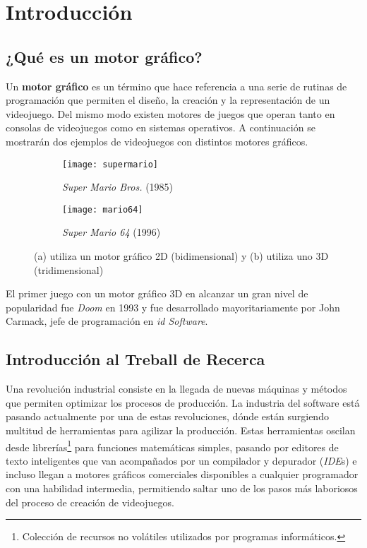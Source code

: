 \chapter{Introducción}
\graphicspath{ {img/chapter1/} {img/chapter4/} {img/chapter6/}}
\section{¿Qué es un motor gráfico?}
Un \textbf{motor gráfico} es un término que hace referencia a una serie de rutinas de programación que permiten el diseño, la creación y la representación de un videojuego. Del mismo modo existen motores de juegos que operan tanto en consolas de videojuegos como en sistemas operativos. A continuación se mostrarán dos ejemplos de videojuegos con distintos motores gráficos.

\begin{figure} [h]
  \centering
  \captionsetup[subfigure]{justification=centering}
  \begin{subfigure}{0.3\textwidth} 
    \texttt{[image: supermario]} 
    \caption{\textit{Super Mario Bros.} (1985)}
  \end{subfigure}
  \begin{subfigure}{0.3\textwidth}
    \texttt{[image: mario64]} 
    \caption{\textit{Super Mario 64} (1996)}
  \end{subfigure}
  \caption{(a) utiliza un motor gráfico 2D (bidimensional) y (b) utiliza uno 3D (tridimensional) }
\end{figure}

El primer juego con un motor gráfico 3D en alcanzar un gran nivel de popularidad fue \textit{Doom} en 1993 y fue desarrollado mayoritariamente por John Carmack, jefe de programación en \textit{id Software}.

\newpage

\section{Introducción al Treball de Recerca}
Una revolución industrial consiste en la llegada de nuevas máquinas y métodos que permiten optimizar los procesos de producción. La industria del software está pasando actualmente por una de estas revoluciones, dónde están surgiendo multitud de herramientas para agilizar la producción. Estas herramientas oscilan desde librerías\footnote{Colección de recursos no volátiles utilizados por programas informáticos.} para funciones matemáticas simples, pasando por editores de texto inteligentes que van acompañados por un compilador y depurador (\textit{IDE}s) e incluso llegan a motores gráficos comerciales disponibles a cualquier programador con una habilidad intermedia, permitiendo saltar uno de los pasos más laboriosos del proceso de creación de videojuegos.

